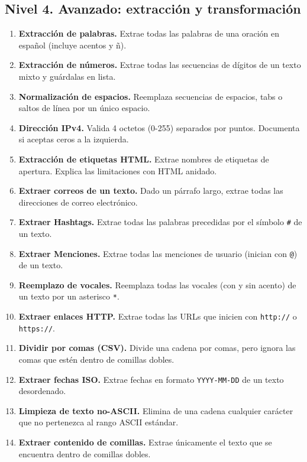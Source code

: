 \documentclass[12pt]{article}
\newcommand{\espacioalumno}{%
  \begin{flushleft}
  \vspace{5cm}
  \end{flushleft}
}
\begin{document}
{\subsection{Nivel 4. Avanzado: extracción y transformación}
\begin{enumerate}[label=\textbf{Ejercicio \arabic*.}, start=46]
\item \textbf{Extracción de palabras.} Extrae todas las palabras de una oración en español (incluye acentos y ñ).
  \vspace{4.5cm}
\item \textbf{Extracción de números.} Extrae todas las secuencias de dígitos de un texto mixto y guárdalas en lista.
  \vspace{4.5cm}
\item \textbf{Normalización de espacios.} Reemplaza secuencias de espacios, tabs o saltos de línea por un único espacio.
  \vspace{4.5cm}
\item \textbf{Dirección IPv4.} Valida 4 octetos (0-255) separados por puntos. Documenta si aceptas ceros a la izquierda.
  \vspace{4.5cm}
\item \textbf{Extracción de etiquetas HTML.} Extrae nombres de etiquetas de apertura. Explica las limitaciones con HTML anidado.
  \vspace{4.5cm}
\item \textbf{Extraer correos de un texto.} Dado un párrafo largo, extrae todas las direcciones de correo electrónico.
  \vspace{4.5cm}
\item \textbf{Extraer Hashtags.} Extrae todas las palabras precedidas por el símbolo \texttt{\#} de un texto.
\espacioalumno
\item \textbf{Extraer Menciones.} Extrae todas las menciones de usuario (inician con \texttt{@}) de un texto.
  \vspace{4.5cm}
\item \textbf{Reemplazo de vocales.} Reemplaza todas las vocales (con y sin acento) de un texto por un asterisco \texttt{*}.
  \vspace{4.5cm}
\item \textbf{Extraer enlaces HTTP.} Extrae todas las URLs que inicien con \texttt{http://} o \texttt{https://}.
  \vspace{4.5cm}
\item \textbf{Dividir por comas (CSV).} Divide una cadena por comas, pero ignora las comas que estén dentro de comillas dobles.
\espacioalumno
\item \textbf{Extraer fechas ISO.} Extrae fechas en formato \texttt{YYYY-MM-DD} de un texto desordenado.
  \vspace{4.3cm}
\item \textbf{Limpieza de texto no-ASCII.} Elimina de una cadena cualquier carácter que no pertenezca al rango ASCII estándar.
  \vspace{4.3cm}
\item \textbf{Extraer contenido de comillas.} Extrae únicamente el texto que se encuentra dentro de comillas dobles.
  \vspace{4.2cm}
\end{enumerate}

}
\end{document}
